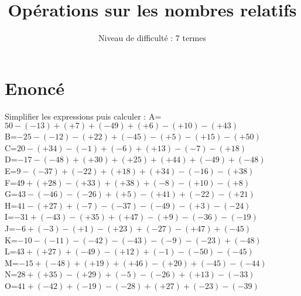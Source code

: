 \documentclass{article}%
\title{Opérations sur les nombres relatifs}%
\author{Niveau de difficulté : 7 termes}%
\date{{}}%
\begin{document}
%
\normalsize%
\pagestyle{empty}%
\maketitle%
\section{Enoncé}%
\label{sec:Enonc}%
Simplifier les expressions puis calculer :%
\newline%
%
\newline%
%
A=$50-(-13)+(+7)+(-49)+(+6)-(+10)-(+43)$\\%
\vspace{0.35cm}%
B=$-25-(-12)-(+22)+(-45)-(+5)-(+15)-(+50)$\\%
\vspace{0.35cm}%
C=$20-(+34)-(-1)+(-6)+(+13)-(-7)-(+18)$\\%
\vspace{0.35cm}%
D=$-17-(-48)+(+30)+(+25)+(+44)+(-49)+(-48)$\\%
\vspace{0.35cm}%
E=$9-(-37)+(-22)+(+18)+(+34)-(-16)-(+38)$\\%
\vspace{0.35cm}%
F=$49+(+28)-(+33)+(+38)+(-8)-(+10)-(+8)$\\%
\vspace{0.35cm}%
G=$43-(-46)-(-26)+(+5)-(+41)+(-22)-(+21)$\\%
\vspace{0.35cm}%
H=$41-(+27)+(-7)-(-37)-(-49)-(+3)-(-24)$\\%
\vspace{0.35cm}%
I=$-31+(-43)-(+35)+(+47)-(+9)-(-36)-(-19)$\\%
\vspace{0.35cm}%
J=$-6+(-3)-(+1)-(+23)+(-27)-(+47)+(-45)$\\%
\vspace{0.35cm}%
K=$-10-(-11)-(-42)-(-43)-(-9)-(-23)+(-48)$\\%
\vspace{0.35cm}%
L=$43+(+27)+(-49)-(+12)+(-1)-(-50)-(-45)$\\%
\vspace{0.35cm}%
M=$-15+(-48)+(+19)+(+46)-(+20)+(-45)-(-44)$\\%
\vspace{0.35cm}%
N=$28+(+35)-(+29)+(-5)-(-26)+(+13)-(-33)$\\%
\vspace{0.35cm}%
O=$41+(-42)+(-19)-(-28)+(+27)+(-23)-(-39)$\\%
\end{document}

